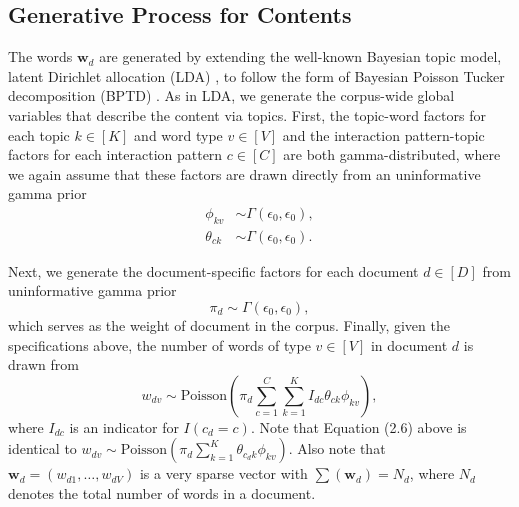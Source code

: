 \documentclass[ba]{imsart}
\numberwithin{equation}{section}
\theoremstyle{plain}
\begin{document}
\subsection{Generative Process for Contents}\label{subsec:Content generating process}

The words $\boldsymbol{w}_d$ are generated by extending the well-known Bayesian topic model, latent Dirichlet allocation (LDA) \citep{Blei2003}, to follow the form of Bayesian Poisson Tucker decomposition (BPTD) \citep{schein2016bayesian}. As in LDA, we generate the corpus-wide global variables that describe the content via topics. First, the topic-word factors for each topic $k\in [K]$ and word type $v\in [V]$ and the interaction pattern-topic factors for each interaction pattern $c \in [C]$ are both gamma-distributed, where we again assume that these factors are drawn directly from an uninformative gamma prior
\begin{equation}
\begin{aligned}
\phi_{kv}& \sim  \Gamma(\epsilon_0,\epsilon_0),\\
\theta_{ck}& \sim  \Gamma(\epsilon_0,\epsilon_0).
\end{aligned}
\end{equation}

Next, we generate the document-specific factors for each document $d \in [D]$ from uninformative gamma prior
\begin{equation}
\pi_{d}\sim \Gamma(\epsilon_0,\epsilon_0),
\end{equation}
which serves as the weight of document in the corpus. Finally, given the specifications above, the number of words of type $v\in [V]$ in document $d$ is drawn from 
\begin{equation}
w_{dv} \sim \mbox{Poisson}(\pi_{d}\sum_{c=1}^C \sum_{k=1}^K I_{dc} \theta_{ck}\phi_{kv}),
\end{equation}
where $I_{dc}$ is an indicator for $I(c_d=c)$. Note that Equation (2.6) above is identical to $w_{dv} \sim \mbox{Poisson}(\pi_{d}\sum_{k=1}^K \theta_{c_dk}\phi_{kv})$. Also note that $\boldsymbol{w}_d = (w_{d1},\ldots,w_{dV})$ is a very sparse vector with $\sum(\boldsymbol{w}_d) = N_d$, where $N_d$ denotes the total number of words in a document. ~
\end{document}

